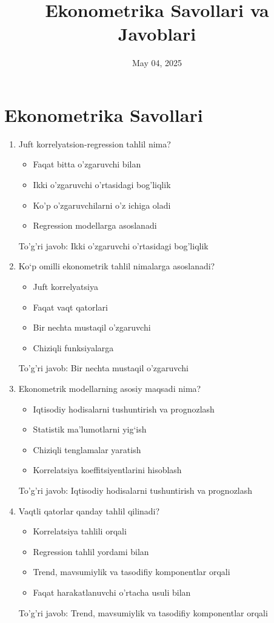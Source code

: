 \documentclass[a4paper,12pt]{article}
\title{Ekonometrika Savollari va Javoblari}
\author{}
\date{May 04, 2025}
\begin{document}
\maketitle

\section*{Ekonometrika Savollari}

\begin{enumerate}[label=\arabic*.]
    \item Juft korrelyatsion-regression tahlil nima?
    \begin{itemize}
        \item Faqat bitta o'zgaruvchi bilan
        \item Ikki o'zgaruvchi o'rtasidagi bog'liqlik
        \item Ko'p o'zgaruvchilarni o'z ichiga oladi
        \item Regression modellarga asoslanadi
    \end{itemize}
    To'g'ri javob: Ikki o'zgaruvchi o'rtasidagi bog'liqlik

    \item Ko‘p omilli ekonometrik tahlil nimalarga asoslanadi?
    \begin{itemize}
        \item Juft korrelyatsiya
        \item Faqat vaqt qatorlari
        \item Bir nechta mustaqil o'zgaruvchi
        \item Chiziqli funksiyalarga
    \end{itemize}
    To'g'ri javob: Bir nechta mustaqil o'zgaruvchi

    \item Ekonometrik modellarning asosiy maqsadi nima?
    \begin{itemize}
        \item Iqtisodiy hodisalarni tushuntirish va prognozlash
        \item Statistik ma'lumotlarni yig‘ish
        \item Chiziqli tenglamalar yaratish
        \item Korrelatsiya koeffitsiyentlarini hisoblash
    \end{itemize}
    To'g'ri javob: Iqtisodiy hodisalarni tushuntirish va prognozlash

    \item Vaqtli qatorlar qanday tahlil qilinadi?
    \begin{itemize}
        \item Korrelatsiya tahlili orqali
        \item Regression tahlil yordami bilan
        \item Trend, mavsumiylik va tasodifiy komponentlar orqali
        \item Faqat harakatlanuvchi o'rtacha usuli bilan
    \end{itemize}
    To'g'ri javob: Trend, mavsumiylik va tasodifiy komponentlar orqali


\end{enumerate}
\end{document}
